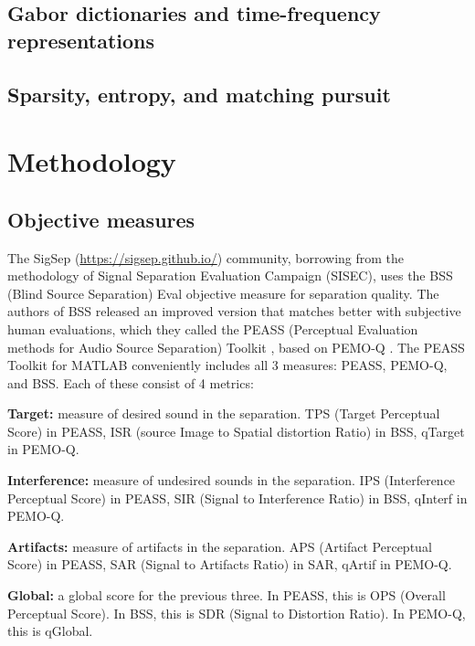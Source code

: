 \documentclass[letter,12pt]{article}
\newenvironment{tight_itemize}{
\begin{itemize}
  \setlength{\itemsep}{0pt}
  \setlength{\parskip}{0pt}
}{\end{itemize}}
\begin{document}
\subsection{Gabor dictionaries and time-frequency representations}

\subsection{Sparsity, entropy, and matching pursuit}

\section{Methodology}
\label{sec:methodology}

\subsection{Objective measures}

The SigSep (\href{https://sigsep.github.io/}{https://sigsep.github.io/}) community, borrowing from the methodology of Signal Separation Evaluation Campaign (SISEC), uses the BSS (Blind Source Separation) Eval \cite{bss} objective measure for separation quality. The authors of BSS released an improved version that matches better with subjective human evaluations, which they called the PEASS (Perceptual Evaluation methods for Audio Source Separation) Toolkit \cite{peass}, based on PEMO-Q \cite{pemoq}. The PEASS Toolkit for MATLAB \cite{peassmatlab} conveniently includes all 3 measures: PEASS, PEMO-Q, and BSS. Each of these consist of 4 metrics:

\begin{tight_itemize}
\item
	\textbf{Target:} measure of desired sound in the separation. TPS (Target Perceptual Score) in PEASS, ISR (source Image to Spatial distortion Ratio) in BSS, qTarget in PEMO-Q.
\item
	\textbf{Interference:} measure of undesired sounds in the separation. IPS (Interference Perceptual Score) in PEASS, SIR (Signal to Interference Ratio) in BSS, qInterf in PEMO-Q.
\item
	\textbf{Artifacts:} measure of artifacts in the separation. APS (Artifact Perceptual Score) in PEASS, SAR (Signal to Artifacts Ratio) in SAR, qArtif in PEMO-Q.
\item
	\textbf{Global:} a global score for the previous three. In PEASS, this is OPS (Overall Perceptual Score). In BSS, this is SDR (Signal to Distortion Ratio). In PEMO-Q, this is qGlobal.
\end{tight_itemize}
\end{document}
